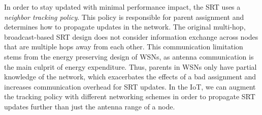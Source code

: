 In order to stay updated with minimal performance impact, the SRT uses a \textit{neighbor tracking policy}.
This policy is responsible for parent assignment and determines how to propagate updates in the network. The original multi-hop, broadcast-based SRT design does not consider 
information exchange across nodes that are multiple hops away from each other. This communication limitation stems from the energy preserving design of WSNs, as antenna communication is the main culprit of energy expenditure.
Thus, parents in WSNs only have partial knowledge of the network, which exacerbates the effects of a bad assignment and increases communication overhead for SRT updates. In the IoT, we can augment the tracking policy with different networking schemes in order to propagate SRT updates further than just the antenna range of a node.





